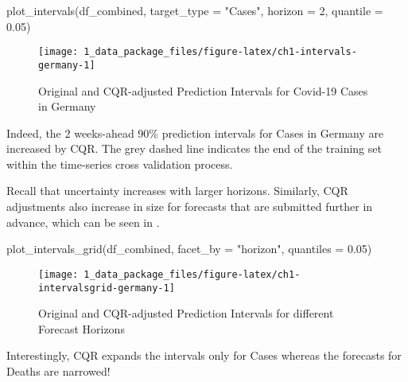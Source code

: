 \documentclass[
]{article}
\newenvironment{Shaded}{\begin{snugshade}}{\end{snugshade}}
\newcommand{\AttributeTok}[1]{\textcolor[rgb]{0.77,0.63,0.00}{#1}}
\newcommand{\DecValTok}[1]{\textcolor[rgb]{0.00,0.00,0.81}{#1}}
\newcommand{\FloatTok}[1]{\textcolor[rgb]{0.00,0.00,0.81}{#1}}
\newcommand{\FunctionTok}[1]{\textcolor[rgb]{0.00,0.00,0.00}{#1}}
\newcommand{\NormalTok}[1]{#1}
\newcommand{\StringTok}[1]{\textcolor[rgb]{0.31,0.60,0.02}{#1}}
\begin{document}
\begin{Shaded}
\begin{Highlighting}[]
\FunctionTok{plot\_intervals}\NormalTok{(df\_combined, }\AttributeTok{target\_type =} \StringTok{"Cases"}\NormalTok{, }\AttributeTok{horizon =} \DecValTok{2}\NormalTok{, }\AttributeTok{quantile =} \FloatTok{0.05}\NormalTok{)}
\end{Highlighting}
\end{Shaded}

\begin{figure}

{\centering \texttt{[image: 1\_data\_package\_files/figure-latex/ch1-intervals-germany-1]} 

}

\caption{Original and CQR-adjusted Prediction Intervals for Covid-19 Cases in Germany}\label{fig:ch1-intervals-germany}
\end{figure}

Indeed, the 2 weeks-ahead \(90\)\% prediction intervals for Cases in Germany are increased by CQR.
The grey dashed line indicates the end of the training set within the time-series cross validation process.

Recall that uncertainty increases with larger horizons.
Similarly, CQR adjustments also increase in size for forecasts that are submitted further in advance, which can be seen in .

\begin{Shaded}
\begin{Highlighting}[]
\FunctionTok{plot\_intervals\_grid}\NormalTok{(df\_combined, }\AttributeTok{facet\_by =} \StringTok{"horizon"}\NormalTok{, }\AttributeTok{quantiles =} \FloatTok{0.05}\NormalTok{)}
\end{Highlighting}
\end{Shaded}

\begin{figure}

{\centering \texttt{[image: 1\_data\_package\_files/figure-latex/ch1-intervalsgrid-germany-1]} 

}

\caption{Original and CQR-adjusted Prediction Intervals for different Forecast Horizons}\label{fig:ch1-intervalsgrid-germany}
\end{figure}

Interestingly, CQR expands the intervals only for Cases whereas the forecasts for Deaths are narrowed!
\end{document}
